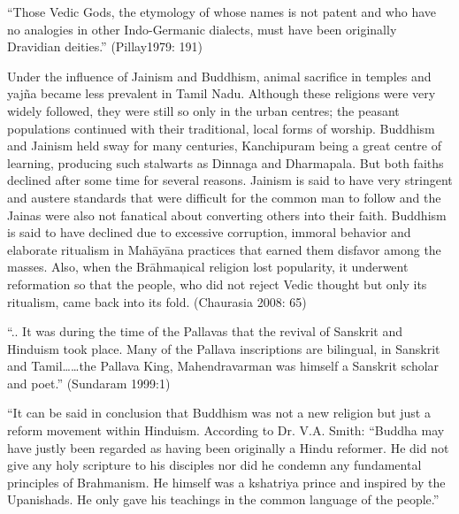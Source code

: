 \begin{myquote}
“Those Vedic Gods, the etymology of whose names is not patent and who have no analogies in other Indo-Germanic dialects, must have been originally Dravidian deities.” (Pillay1979: 191)
\end{myquote}

Under the influence of Jainism and Buddhism, animal sacrifice in temples and yajña became less prevalent in Tamil Nadu. Although these religions were very widely followed, they were still so only in the urban centres; the peasant populations continued with their traditional, local forms of worship. Buddhism and Jainism held sway for many centuries, Kanchipuram being a great centre of learning, producing such stalwarts as Dinnaga and Dharmapala. But both faiths declined after some time for several reasons. Jainism is said to have very stringent and austere standards that were difficult for the common man to follow and the Jainas were also not fanatical about converting others into their faith. Buddhism is said to have declined due to excessive corruption, immoral behavior and elaborate ritualism in Mahāyāna practices that earned them disfavor among the masses. Also, when the Brāhmaņical religion lost popularity, it underwent reformation so that the people, who did not reject Vedic thought but only its ritualism, came back into its fold. (Chaurasia 2008: 65)

\vskip 2pt

\begin{myquote}
“.. It was during the time of the Pallavas that the revival of Sanskrit and Hinduism took place. Many of the Pallava inscriptions are bilingual, in Sanskrit and Tamil……the Pallava King, Mahendravarman was himself a Sanskrit scholar and poet.” (Sundaram 1999:1)
\end{myquote}

\vskip 2pt

\begin{myquote}
“It can be said in conclusion that Buddhism was not a new religion but just a reform movement within Hinduism. According to Dr. V.A. Smith: “Buddha may have justly been regarded as having been originally a Hindu reformer. He did not give any holy scripture to his disciples nor did he condemn any fundamental principles of Brahmanism. He himself was a kshatriya prince and inspired by the Upanishads. He only gave his teachings in the common language of the people.”
\end{myquote}

